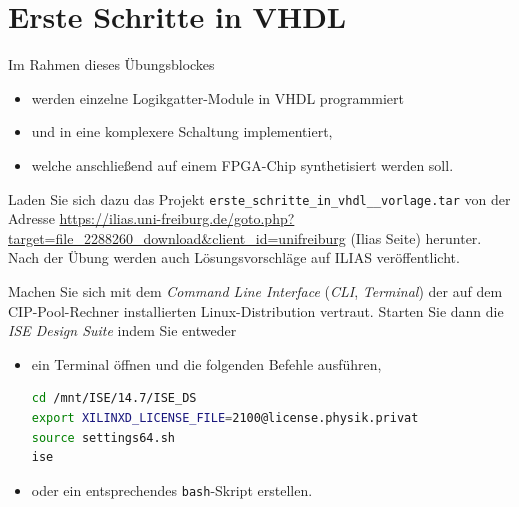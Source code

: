 \documentclass[12pt]{article}
\begin{document}




\part*{Erste Schritte in VHDL}


Im Rahmen dieses Übungsblockes
\vspace*{-5pt}
\begin{itemize}
    \setlength\itemsep{-5pt}
    \item werden einzelne Logikgatter-Module in VHDL programmiert
    \item und in eine komplexere Schaltung implementiert,
    \item welche anschließend auf einem FPGA-Chip synthetisiert werden soll.
\end{itemize}


Laden Sie sich dazu das Projekt
\texttt{erste\_schritte\_in\_vhdl\_\_vorlage.tar}
von der Adresse \url{https://ilias.uni-freiburg.de/goto.php?target=file_2288260_download&client_id=unifreiburg} (Ilias Seite)  herunter.
Nach der Übung werden auch Lösungsvorschläge auf ILIAS veröffentlicht.







Machen Sie sich mit dem \textit{Command Line Interface} (\textit{CLI}, \textit{Terminal}) der auf dem CIP-Pool-Rechner installierten Linux-Distribution vertraut. Starten Sie dann die \textit{ISE Design Suite} indem Sie entweder


\begin{itemize}
\setlength\itemsep{-25pt}


\item ein Terminal öffnen und die folgenden Befehle ausführen,
\begin{lstlisting}[language=bash]
cd /mnt/ISE/14.7/ISE_DS
export XILINXD_LICENSE_FILE=2100@license.physik.privat
source settings64.sh
ise
\end{lstlisting}
\vspace*{-1mm}


\item oder ein entsprechendes \texttt{bash}-Skript erstellen.


\end{itemize}
\end{document}
